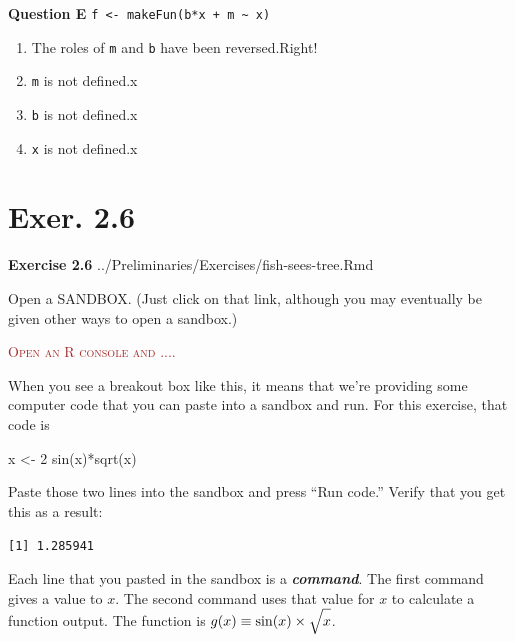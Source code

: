 \documentclass[
  letterpaper,
  DIV=11,
  numbers=noendperiod,
  oneside]{article}
\newenvironment{Shaded}{\begin{snugshade}}{\end{snugshade}}
\newcommand{\DecValTok}[1]{\textcolor[rgb]{0.68,0.00,0.00}{#1}}
\newcommand{\FunctionTok}[1]{\textcolor[rgb]{0.28,0.35,0.67}{#1}}
\newcommand{\NormalTok}[1]{\textcolor[rgb]{0.00,0.23,0.31}{#1}}
\newcommand{\OtherTok}[1]{\textcolor[rgb]{0.00,0.23,0.31}{#1}}
\newcommand{\SpecialCharTok}[1]{\textcolor[rgb]{0.37,0.37,0.37}{#1}}
\providecommand{\tightlist}{%
  \setlength{\itemsep}{0pt}\setlength{\parskip}{0pt}}\usepackage{longtable,booktabs,array}
\newenvironment{scaffolding}%
{%
\textcolor{brown}{\hrulefill}%
  \par\vspace{.3\baselineskip}%
  \textcolor{brown}{\scshape Open an R console and ....}%
  \par\vspace{\baselineskip}%
}%
{\textcolor{brown}{\hrulefill}}
\begin{document}
\begin{multicols}{2}
\textbf{Question E}
\texttt{f\ \textless{}-\ makeFun(b*x\ +\ m\ \textasciitilde{}\ x)}

\begin{enumerate}
\def\labelenumi{\roman{enumi}.}
\tightlist
\item
  {The roles of \texttt{m} and \texttt{b} have been
  reversed.{Right!~}}\\
\item
  {\texttt{m} is not defined.{x}}\\
\item
  {\texttt{b} is not defined.{x}}\\
\item
  {\texttt{x} is not defined.{x}}
\end{enumerate}

\hypertarget{exer.-2.6}{%
\section*{Exer. 2.6}\label{exer.-2.6}}

\textbf{Exercise 2.6} ../Preliminaries/Exercises/fish-sees-tree.Rmd

Open a SANDBOX. (Just click on that link, although you may eventually be
given other ways to open a sandbox.)

\begin{scaffolding}
When you see a breakout box like this, it means that we're providing
some computer code that you can paste into a sandbox and run. For this
exercise, that code is

\begin{Shaded}
\begin{Highlighting}[]
\NormalTok{x }\OtherTok{\textless{}{-}} \DecValTok{2}
\FunctionTok{sin}\NormalTok{(x)}\SpecialCharTok{*}\FunctionTok{sqrt}\NormalTok{(x)}
\end{Highlighting}
\end{Shaded}

Paste those two lines into the sandbox and press ``Run code.'' Verify
that you get this as a result:

\texttt{{[}1{]}\ 1.285941}

\end{scaffolding}

Each line that you pasted in the sandbox is a \textbf{\emph{command}}.
The first command gives a value to \(x\). The second command uses that
value for \(x\) to calculate a function output. The function is
\(g(x)\equiv \sin(x) \times \sqrt{\strut x}\).


\end{multicols}
\end{document}
